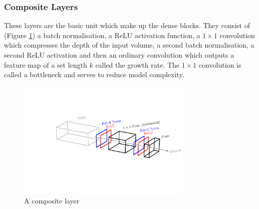 \subsubsection{Composite Layers}
These layers are the basic unit which make up the dense blocks. They consist of (Figure \ref{fig:machine_learning:composite_layer}) a batch normalisation, a ReLU activation function, a $1\times{}1$ convolution which compresses the depth of the input volume, a second batch normalisation, a second ReLU activation and then an ordinary convolution which outputs a feature map of a set length $k$ called the growth rate. The $1\times{}1$ convolution is called a bottleneck and serves to reduce model complexity.
\begin{figure}[h!]
    \includegraphics[width=0.75\textwidth]{figures/machine_learning/composite_layer.pdf}
    \caption{A composite layer}
        \label{fig:machine_learning:composite_layer}
\end{figure}


